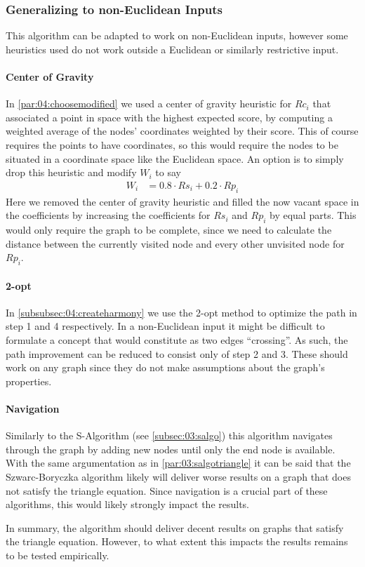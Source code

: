 \subsubsection{Generalizing to non-Euclidean Inputs}

This algorithm can be adapted to work on non-Euclidean inputs, however some heuristics used do not work outside a Euclidean or similarly restrictive input.

\paragraph{Center of Gravity}
In \cref{par:04:choosemodified} we used a center of gravity heuristic for $Rc_i$ that associated a point in space with the highest expected score,
by computing a weighted average of the nodes' coordinates weighted by their score.
This of course requires the points to have coordinates, so this would require the nodes to be situated in a coordinate space like the Euclidean space.
An option is to simply drop this heuristic and modify $W_i$ to say
\begin{align*}
	W_i & = 0.8 \cdot Rs_i + 0.2 \cdot Rp_i
\end{align*}
Here we removed the center of gravity heuristic and filled the now vacant space in the coefficients by increasing the coefficients for $Rs_i$ and $Rp_i$ by equal parts. 
This would only require the graph to be complete, since we need to calculate the distance between the currently visited node and every other unvisited node for $Rp_i$.

\paragraph{2-opt}
In \cref{subsubsec:04:createharmony} we use the 2-opt method \cite{croes_method_1958} to optimize the path in step 1 and 4 respectively.
In a non-Euclidean input it might be difficult to formulate a concept that would constitute as two edges \enquote{crossing}.
As such, the path improvement can be reduced to consist only of step 2 and 3.
These should work on any graph since they do not make assumptions about the graph's properties.

\paragraph{Navigation}
Similarly to the S-Algorithm (see \cref{subsec:03:salgo}) this algorithm navigates through the graph by adding new nodes until only the end node is available.
With the same argumentation as in \cref{par:03:salgotriangle} it can be said that the Szwarc-Boryczka algorithm likely will deliver worse results on a graph that does not satisfy the triangle equation.
Since navigation is a crucial part of these algorithms, this would likely strongly impact the results.

In summary, the algorithm should deliver decent results on graphs that satisfy the triangle equation.
However, to what extent this impacts the results remains to be tested empirically.
